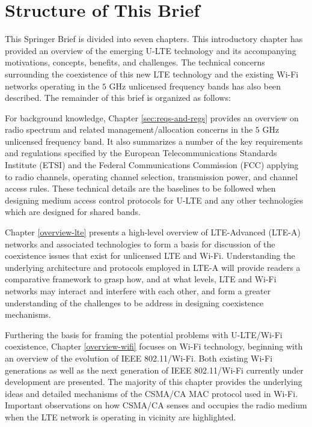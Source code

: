 \section{Structure of This Brief}

This Springer Brief is divided into seven chapters. This introductory chapter has provided an overview of the emerging \mbox{U-LTE} technology and its accompanying motivations, concepts, benefits, and challenges. The technical concerns surrounding the coexistence of this new LTE technology and the existing \mbox{Wi-Fi} networks operating in the $5$ GHz unlicensed frequency bands has also been described. The remainder of this brief is organized as follows: 

For background knowledge, Chapter \ref{sec:reqs-and-regs} provides an overview on radio spectrum and related management/allocation concerns in the $5$ GHz unlicensed frequency band. It also summarizes a number of the key requirements and regulations specified by the European Telecommunications Standards Institute (ETSI) and the Federal Communications Commission (FCC) applying to radio channels, operating channel selection, transmission power, and channel access rules. These technical details are the baselines to be followed when designing medium access control protocols for \mbox{U-LTE} and any other technologies which are designed for shared bands.

Chapter \ref{overview-lte} presents a high-level overview of LTE-Advanced (LTE-A) networks and associated technologies to form a basis for discussion of the coexistence issues that exist for unlicensed LTE and \mbox{Wi-Fi}. Understanding the underlying architecture and protocols employed in LTE-A will provide readers a comparative framework to grasp how, and at what levels, LTE and \mbox{Wi-Fi} networks may interact and interfere with each other, and form a greater understanding of the challenges to be address in designing coexistence mechanisms.

Furthering the basis for framing the potential problems with \mbox{U-LTE}/\mbox{Wi-Fi} coexistence, Chapter \ref{overview-wifi} focuses on \mbox{Wi-Fi} technology, beginning with an overview of the evolution of IEEE 802.11/\mbox{Wi-Fi}. Both existing \mbox{Wi-Fi} generations as well as the next generation of IEEE 802.11/\mbox{Wi-Fi} currently under development are presented. The majority of this chapter provides the underlying ideas and detailed mechanisms of the CSMA/CA MAC protocol used in \mbox{Wi-Fi}. Important observations on how CSMA/CA senses and occupies the radio medium when the LTE network is operating in vicinity are highlighted.

